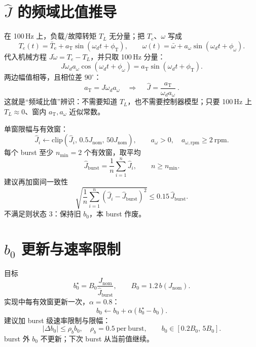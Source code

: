 \documentclass[11pt,a4paper]{article}
\newcommand{\Jnom}{J_{\mathrm{nom}}}
\newcommand{\Jhat}{\hat J}
\newcommand{\bzero}{b_0}
\newcommand{\Te}{T_e}
\newcommand{\rpm}{\mathrm{rpm}}
\begin{document}
\section{$\Jhat$ 的频域比值推导}

在 100\,Hz 上，负载/故障转矩 $T_L$ 无分量；把 $\Te$、$\omega$ 写成
\begin{equation}
\Te(t)=\bar T_{\mathrm{e}}+a_{\mathrm{T}}\sin(\omega_dt+\phi_{\mathrm{T}}),\qquad
\omega(t)=\bar\omega+a_{\omega}\sin(\omega_dt+\phi_{\omega}).
\label{eq:harm}
\end{equation}
代入机械方程 $J\dot\omega=\Te-T_L$，并只取 100\,Hz 分量：
\begin{equation}
J\omega_da_{\omega}\cos(\omega_dt+\phi_{\omega})
=a_{\mathrm{T}}\sin(\omega_dt+\phi_{\mathrm{T}}).
\label{eq:balance}
\end{equation}
两边幅值相等，且相位差 $90^\circ$：
\begin{equation}
a_{\mathrm{T}}=J\omega_da_{\omega}
\quad\Longrightarrow\quad
\boxed{\ \Jhat=\frac{a_{\mathrm{T}}}{\omega_da_{\omega}}\ }.
\label{eq:Jhat}
\end{equation}
这就是“频域比值”辨识：不需要知道 $T_L$，也不需要控制器模型；只要 100\,Hz 上 $T_L\approx0$、窗内 $a_{\mathrm{T}},a_{\omega}$ 近似常数。

单窗限幅与有效窗：
\begin{equation}
\Jhat_i\leftarrow\mathrm{clip}\left(\Jhat_i,\,0.5\Jnom,\,50\Jnom\right),
\qquad
a_{\omega}>0,\quad a_{\omega,\rpm}\ge2\ \rpm.
\label{eq:clip}
\end{equation}
每个 burst 至少 $n_{\min}=2$ 个有效窗，取平均
\begin{equation}
\Jhat_{\mathrm{burst}}=\frac{1}{n}\sum_{i=1}^{n}\Jhat_i,\qquad n\ge n_{\min}.
\label{eq:jburst}
\end{equation}
建议再加窗间一致性
\begin{equation}
\sqrt{\frac{1}{n}\sum_{i=1}^{n}\left(\Jhat_i-\Jhat_{\mathrm{burst}}\right)^2}
\le0.15\,\Jhat_{\mathrm{burst}}.
\label{eq:std}
\end{equation}
不满足则状态 3：保持旧 $\bzero$，本 burst 作废。

\section{$\bzero$ 更新与速率限制}

目标
\begin{equation}
\bzero^{\star}=B_0\frac{\Jnom}{\Jhat_{\mathrm{burst}}},\qquad
B_0=1.2\,b(\Jnom).
\label{eq:b0star}
\end{equation}
实现中每有效窗更新一次，$\alpha=0.8$：
\begin{equation}
\bzero\leftarrow\bzero+\alpha\left(\bzero^{\star}-\bzero\right).
\label{eq:b0upd}
\end{equation}
建议加 burst 级速率限制与限幅：
\begin{equation}
\left|\Delta\bzero\right|\le\rho_b\bzero,\quad \rho_b=0.5\ \mathrm{per\ burst},
\qquad
\bzero\in\left[0.2B_0,\,5B_0\right].
\label{eq:rate}
\end{equation}
burst 外 $\bzero$ 不更新；下次 burst 从当前值继续。
\end{document}
